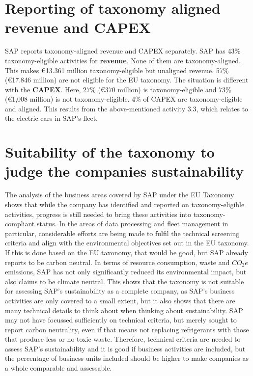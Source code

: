 \section{Reporting of taxonomy aligned revenue and CAPEX}
SAP reports taxonomy-aligned revenue and \ac{CAPEX} separately. SAP has 43\% taxonomy-eligible activities for \textbf{revenue}. None of them are taxonomy-aligned. This makes €13.361 million taxonomy-eligible but unaligned revenue. 57\% (€17.846 million) are not eligible for the EU taxonomy. The situation is different with the \textbf{\ac{CAPEX}}. Here, 27\% (€370 million) is taxonomy-eligible and 73\% (€1,008 million) is not taxonomy-eligible. 4\% of \ac{CAPEX} are taxonomy-eligible and aligned. This results from the above-mentioned activity 3.3, which relates to the electric cars in SAP's fleet.
\autocites[Cf.][92-98]{sapreport}

\section{Suitability of the taxonomy to judge the companies sustainability}
The analysis of the business areas covered by SAP under the EU Taxonomy shows that while the company has identified and reported on taxonomy-eligible activities, progress is still needed to bring these activities into taxonomy-compliant status. In the areas of data processing and fleet management in particular, considerable efforts are being made to fulfil the technical screening criteria and align with the environmental objectives set out in the EU taxonomy. If this is done based on the EU taxonomy, that would be good, but SAP already reports to be carbon neutral. In terms of resource consumption, waste and $CO_2e$ emissions, SAP has not only significantly reduced its environmental impact, but also claims to be climate neutral. This shows that the taxonomy is not suitable for assessing SAP's sustainability as a complete company, as SAP's business activities are only covered to a small extent, but it also shows that there are many technical details to think about when thinking about sustainability. SAP may not have focussed sufficiently on technical criteria, but merely sought to report carbon neutrality, even if that means not replacing refrigerants with those that produce less or no toxic waste. Therefore, technical criteria are needed to assess SAP's sustainability and it is good if business activities are included, but the percentage of business units included should be higher to make companies as a whole comparable and assessable.
\autocites[Cf.][110-115]{sapreport}[Cf.][276-278]{sapreport}